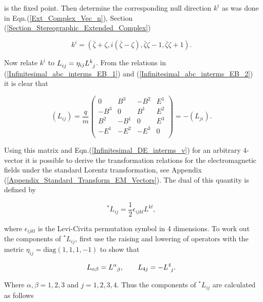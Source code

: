 \noindent is the fixed point. Then determine the corresponding null direction $k^i$ as was done in Eqn.(\ref{Ext_Complex_Vec_n}), Section (\ref{Section_Stereographic_Extended_Complex})

\begin{equation}\label{Infinitesimal_K_Unit_Vector_Formula}
k^i = \left(\bar{\zeta} + \zeta,i(\bar{\zeta} - \zeta),\bar{\zeta}\zeta - 1,\bar{\zeta}\zeta + 1\right).
\end{equation}

\noindent Now relate $k^i$ to $\tensor{L}{_i_j} = \eta_{ij} \tensor{L}{^k_j}$. From the relations in (\ref{Infinitesimal_abc_interms_EB_1}) and (\ref{Infinitesimal_abc_interms_EB_2}) it is clear that

\begin{equation*}  
\left( L_{ij} \right) = 
\frac{q}{m}
\left(
\begin{array}{cccc}
0    & B^3  & -B^2 & E^1 \\
-B^3 & 0    & B^1  & E^2 \\
B^2  & -B^1 & 0    & E^3 \\
-E^1 & -E^2 & -E^3 & 0   \\
\end{array}
\right)
=
-(L_{ji}).
\end{equation*}

\noindent Using this matrix and Eqn.(\ref{Infinitesimal_DE_interms_v}) for an arbitrary $4$-vector it is possible to derive the transformation relations for the electromagnetic fields under the standard Lorentz transformation, see Appendix (\ref{Appendix_Standard_Transform_EM_Vectors}). The dual of this quantity is defined by

\begin{equation*}
^*L_{ij} = \frac{1}{2} \epsilon_{ijkl} L^{kl},
\end{equation*}

\noindent where $\epsilon_{ijkl}$ is the Levi-Civita permutation symbol in 4 dimensions. To work out the components of $^*L_{ij}$, first use the raising and lowering of operators with the metric $\eta_{ij} = \text{diag}(1,1,1,-1)$ to show that  

\begin{equation*}
L_{\alpha \beta} = \tensor{L}{^\alpha_\beta}, \qquad L_{4 j} = - \tensor{L}{^4_j}.
\end{equation*}

\noindent Where $\alpha,\beta = 1,2,3$ and $j = 1,2,3,4$. Thus the components of $^*L_{ij}$ are calculated as follows

